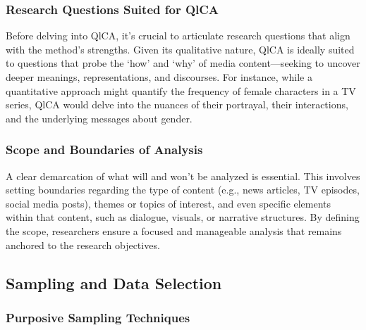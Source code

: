 \documentclass[
  b5paper]{book}
\begin{document}
\hypertarget{research-questions-suited-for-qlca}{%
\subsubsection*{Research Questions Suited for QlCA}\label{research-questions-suited-for-qlca}}

Before delving into QlCA, it's crucial to articulate research questions that align with the method's strengths. Given its qualitative nature, QlCA is ideally suited to questions that probe the `how' and `why' of media content---seeking to uncover deeper meanings, representations, and discourses. For instance, while a quantitative approach might quantify the frequency of female characters in a TV series, QlCA would delve into the nuances of their portrayal, their interactions, and the underlying messages about gender.

\hypertarget{scope-and-boundaries-of-analysis}{%
\subsubsection*{Scope and Boundaries of Analysis}\label{scope-and-boundaries-of-analysis}}

A clear demarcation of what will and won't be analyzed is essential. This involves setting boundaries regarding the type of content (e.g., news articles, TV episodes, social media posts), themes or topics of interest, and even specific elements within that content, such as dialogue, visuals, or narrative structures. By defining the scope, researchers ensure a focused and manageable analysis that remains anchored to the research objectives.

\hypertarget{sampling-and-data-selection}{%
\subsection*{Sampling and Data Selection}\label{sampling-and-data-selection}}

\hypertarget{purposive-sampling-techniques}{%
\subsubsection*{Purposive Sampling Techniques}\label{purposive-sampling-techniques}}
\end{document}
